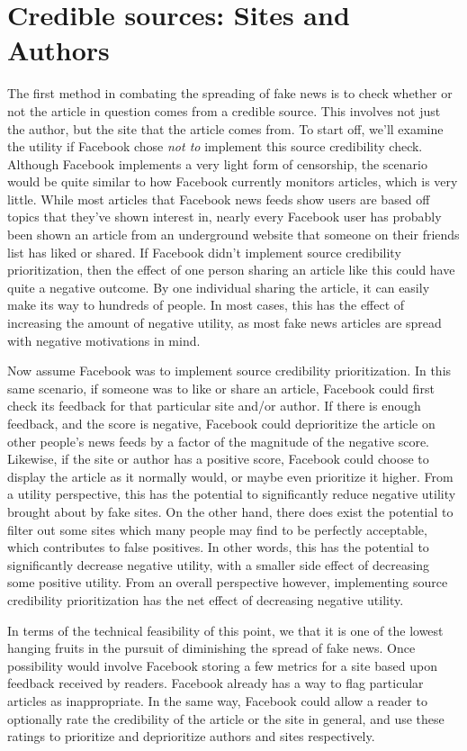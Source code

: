 \documentclass[12pt]{article}
\begin{document}
\section{Credible sources: Sites and Authors}
The first method in combating the spreading of fake news is to check whether or not the article in question comes from a credible source. This involves not just the author, but the site that the article comes from. To start off, we'll examine the utility if Facebook chose \textit{not to} implement this source credibility check. Although Facebook implements a very light form of censorship, the scenario would be quite similar to how Facebook currently monitors articles, which is very little. While most articles that Facebook news feeds show users are based off topics that they've shown interest in, nearly every Facebook user has probably been shown an article from an underground website that someone on their friends list has liked or shared. If Facebook didn't implement source credibility prioritization, then the effect of one person sharing an article like this could have quite a negative outcome. By one individual sharing the article, it can easily make its way to hundreds of people. In most cases, this has the effect of increasing the amount of negative utility, as most fake news articles are spread with negative motivations in mind.

Now assume Facebook was to implement source credibility prioritization. In this same scenario, if someone was to like or share an article, Facebook could first check its feedback for that particular site and/or author. If there is enough feedback, and the score is negative, Facebook could deprioritize the article on other people's news feeds by a factor of the magnitude of the negative score. Likewise, if the site or author has a positive score, Facebook could choose to display the article as it normally would, or maybe even prioritize it higher. From a utility perspective, this has the potential to significantly reduce negative utility brought about by fake sites. On the other hand, there does exist the potential to filter out some sites which many people may find to be perfectly acceptable, which contributes to false positives. In other words, this has the potential to significantly decrease negative utility, with a smaller side effect of decreasing some positive utility. From an overall perspective however, implementing source credibility prioritization has the net effect of decreasing negative utility.

In terms of the technical feasibility of this point, we that it is one of the lowest hanging fruits in the pursuit of diminishing the spread of fake news. Once possibility would involve Facebook storing a few metrics for a site based upon feedback received by readers. Facebook already has a way to flag particular articles as inappropriate. In the same way, Facebook could allow a reader to optionally rate the credibility of the article or the site in general, and use these ratings to prioritize and deprioritize authors and sites respectively. 
\end{document}
